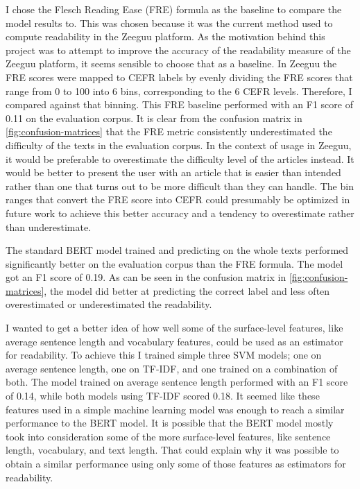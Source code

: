 \documentclass[11pt,a4paper]{article}
\begin{document}
I chose the Flesch Reading Ease (FRE) formula as the baseline to compare the model results to.
This was chosen because it was the current method
used to compute readability in the Zeeguu platform. As the motivation behind
this project was to attempt to improve the accuracy of the readability measure
of the Zeeguu platform, it seems sensible to choose that as a baseline. In
Zeeguu the FRE scores were mapped to CEFR labels by evenly dividing the FRE
scores that range from 0 to 100 into 6 bins, corresponding to the 6 CEFR
levels. Therefore, I compared against that binning. This FRE baseline performed with an
F1 score of 0.11 on the evaluation corpus. It is clear from
the confusion matrix in \autoref{fig:confusion-matrices} that the FRE
metric consistently underestimated the difficulty of the texts in the
evaluation corpus. In the context of usage in Zeeguu, it would be preferable to
overestimate the difficulty level of the articles instead. It would be better
to present the user with an article that is easier than intended
rather than one that turns out to be more difficult than they can handle.
The bin ranges that convert the FRE score into CEFR could presumably be optimized in
future work to achieve this better accuracy and a tendency to overestimate
rather than underestimate.

The standard BERT model trained and predicting on the whole
texts performed significantly better on the evaluation corpus than the FRE
formula. The model got an F1 score of 0.19. As can be seen in the confusion
matrix in \autoref{fig:confusion-matrices}, the model did better at
predicting the correct label and less often overestimated or
underestimated the readability.

I wanted to get a better idea of how well some of the surface-level features, like average sentence length
and vocabulary features, could be used as an estimator for
readability. To achieve this I trained simple three SVM models; one on average sentence
length, one on TF-IDF, and one trained on a combination of both. The model trained on
average sentence length performed with an F1 score of 0.14, while both
models using TF-IDF scored 0.18. It seemed like these features used in a
simple machine learning model was enough to reach a similar performance to the
BERT model. It is possible that the BERT model mostly took into consideration
some of the more surface-level features, like sentence length, vocabulary, and
text length. That could explain why it was possible to obtain a similar
performance using only some of those features as estimators for
readability.
\end{document}
